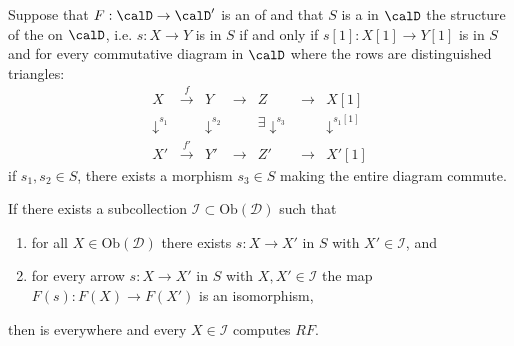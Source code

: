 \begin{proposition} \label{proposition:general_conditions_for_defining_and_computing_right_left_total_derived_functors_of_exact_functors_of_triangulated_categories}
    Suppose that $F: \calD \to \calD'$ is an  of  and that $S$ is a  in $\calD$  the structure of the  on $\calD$, i.e. $s: X \to Y$ is in $S$ if and only if $s[1]: X[1] \to Y[1]$ is in $S$ and  
    for every commutative diagram in $\calD$ where the rows are distinguished triangles:
    \[
    \begin{array}{ccccccc}
    X & \xrightarrow{f} & Y & \to & Z & \to & X[1] \\
    \downarrow^{s_1} & & \downarrow^{s_2} & & \exists \downarrow^{s_3} & & \downarrow^{s_1[1]} \\
    X' & \xrightarrow{f'} & Y' & \to & Z' & \to & X'[1]
    \end{array}
    \]
    if $s_1, s_2 \in S$, there exists a morphism $s_3 \in S$ making the entire diagram commute.

    If there exists a subcollection $\mathcal{I} \subset \text{Ob}(\mathcal{D})$ such that
    \begin{enumerate}
        \item for all $X \in \text{Ob}(\mathcal{D})$ there exists $s : X \to X'$ in $S$ with $X' \in \mathcal{I}$, and
        \item for every arrow $s : X \to X'$ in $S$ with $X, X' \in \mathcal{I}$ the map $F(s) : F(X) \to F(X')$ is an isomorphism,
    \end{enumerate}
    then  is everywhere  and every $X \in \mathcal{I}$ computes $RF$. 
    

\end{proposition}
